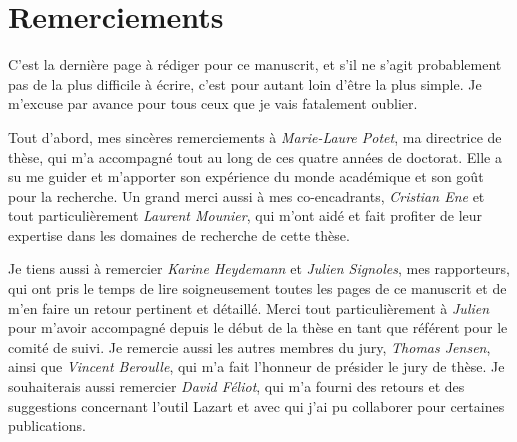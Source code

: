 \documentclass[a4paper,10pt,twoside]{lib/StyleThese}
\begin{document}



\setcounter{page}{0}
\cleardoublepage

\section*{Remerciements}

    C'est la dernière page à rédiger pour ce manuscrit, et s'il ne s'agit probablement pas de la plus difficile à écrire, c'est pour autant loin d'être la plus simple. Je m'excuse par avance pour tous ceux que je vais fatalement oublier.
    
    Tout d'abord, mes sincères remerciements à \textit{Marie-Laure Potet}, ma directrice de thèse, qui m'a accompagné tout au long de ces quatre années de doctorat.
    Elle a su me guider et m'apporter son expérience du monde académique et son goût pour la recherche.
    Un grand merci aussi à mes co-encadrants, \textit{Cristian Ene} et tout particulièrement \textit{Laurent Mounier}, qui m'ont aidé et fait profiter de leur expertise dans les domaines de recherche de cette thèse.
    
    Je tiens aussi à remercier \textit{Karine Heydemann} et \textit{Julien Signoles}, mes rapporteurs, qui ont pris le temps de lire soigneusement toutes les pages de ce manuscrit et de m'en faire un retour pertinent et détaillé.
    Merci tout particulièrement à \textit{Julien} pour m'avoir accompagné depuis le début de la thèse en tant que référent pour le comité de suivi.
    Je remercie aussi les autres membres du jury, \textit{Thomas Jensen}, ainsi que \textit{Vincent Beroulle}, qui m'a fait l'honneur de présider le jury de thèse. 
    Je souhaiterais aussi remercier \textit{David Féliot}, qui m'a fourni des retours et des suggestions concernant l'outil Lazart et avec qui j'ai pu collaborer pour certaines publications. 
    
\end{document}
